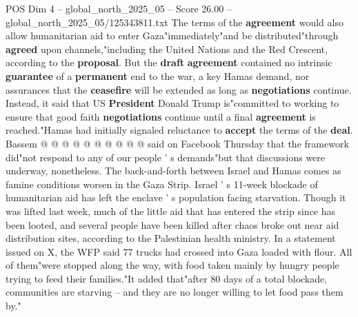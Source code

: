 \begin{textsample}{POS Dim 4 – global\_north\_2025\_05 – Score 26.00 – global\_north\_2025\_05/125343811.txt}
The terms of the \textbf{agreement} would also allow humanitarian aid to enter Gaza"immediately"and be distributed"through \textbf{agreed} upon channels,"including the United Nations and the Red Crescent, according to the \textbf{proposal}.
But the \textbf{draft} \textbf{agreement} contained no intrinsic \textbf{guarantee} of a \textbf{permanent} end to the war, a key Hamas demand, nor assurances that the \textbf{ceasefire} will be extended as long as \textbf{negotiations} continue.
Instead, it said that US \textbf{President} Donald Trump is"committed to working to ensure that good faith \textbf{negotiations} continue until a final \textbf{agreement} is reached."Hamas had initially signaled reluctance to \textbf{accept} the terms of the \textbf{deal}.
Bassem @ @ @ @ @ @ @ @ @ @ said on Facebook Thursday that the framework did"not respond to any of our people ' s demands"but that discussions were underway, nonetheless.
The back-and-forth between Israel and Hamas comes as famine conditions worsen in the Gaza Strip.
Israel ' s 11-week blockade of humanitarian aid has left the enclave ' s population facing starvation.
Though it was lifted last week, much of the little aid that has entered the strip since has been looted, and several people have been killed after chaos broke out near aid distribution sites, according to the Palestinian health ministry.
In a statement issued on X, the WFP said 77 trucks had crossed into Gaza loaded with flour.
All of them"were stopped along the way, with food taken mainly by hungry people trying to feed their families."It added that"after 80 days of a total blockade, communities are starving -- and they are no longer willing to let food pass them by."

\end{textsample}
